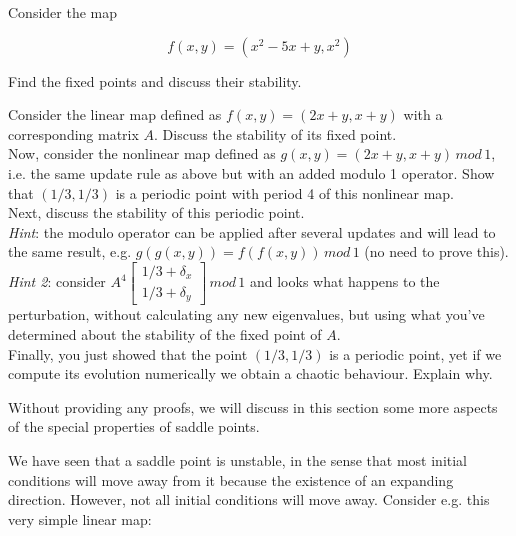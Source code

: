 \begin{exer}
Consider the map 

$$f(x,y) = (x^2-5x+y, x^2)$$

Find the fixed points and discuss their stability.
\end{exer}


\begin{exer}
Consider the linear map defined as $f(x,y) = (2x+y, x+y)$ with a corresponding matrix $A$. Discuss the stability of its fixed point.\\

Now, consider the nonlinear map defined as $g(x,y) = (2x+y, x+y)\, mod \, 1$, i.e. the same update rule as above but with an added modulo 1 operator. Show that $(1/3, 1/3)$ is a periodic point with period 4 of this nonlinear map.\\

Next, discuss the stability of this periodic point.\\

\textit{Hint}: the modulo operator can be applied after several updates and will lead to the same result, e.g.  $g(g(x,y)) = f(f(x,y)) \, mod \, 1$ (no need to prove this).\\
\textit{Hint 2}: consider $A^4 \begin{bmatrix} 1/3 + \delta_x \\ 1/3 + \delta_y \end{bmatrix} \, mod \, 1$ and looks what happens to the perturbation, without calculating any new eigenvalues, but using what you've determined about the stability of the fixed point of $A$.\\

Finally, you just showed that the point $(1/3, 1/3)$ is a periodic point, yet if we compute its evolution numerically we obtain a chaotic behaviour. Explain why.
\end{exer}


\pagebreak


Without providing any proofs, we will discuss in this section some more aspects of the special properties of saddle points.

We have seen that a saddle point is unstable, in the sense that most initial conditions will move away from it because the existence of an expanding direction. However, not all initial conditions will move away. Consider e.g. this very simple linear map:

